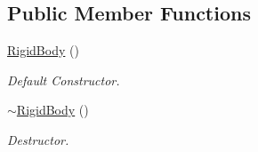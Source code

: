 \subsection*{Public Member Functions}
\begin{DoxyCompactItemize}
\item 
\hypertarget{classContent_1_1Actor_1_1Physics_1_1RigidBody_a112ad1690b67722ab79361ecc843f2e5}{
\hyperlink{classContent_1_1Actor_1_1Physics_1_1RigidBody_a112ad1690b67722ab79361ecc843f2e5}{RigidBody} ()}
\label{classContent_1_1Actor_1_1Physics_1_1RigidBody_a112ad1690b67722ab79361ecc843f2e5}

\begin{DoxyCompactList}\small\item\em Default Constructor. \item\end{DoxyCompactList}\item 
\hypertarget{classContent_1_1Actor_1_1Physics_1_1RigidBody_a849cf0b6a571690b482ece18e89f973f}{
\hyperlink{classContent_1_1Actor_1_1Physics_1_1RigidBody_a849cf0b6a571690b482ece18e89f973f}{$\sim$RigidBody} ()}
\label{classContent_1_1Actor_1_1Physics_1_1RigidBody_a849cf0b6a571690b482ece18e89f973f}

\begin{DoxyCompactList}\small\item\em Destructor. \item\end{DoxyCompactList}\end{DoxyCompactItemize}
